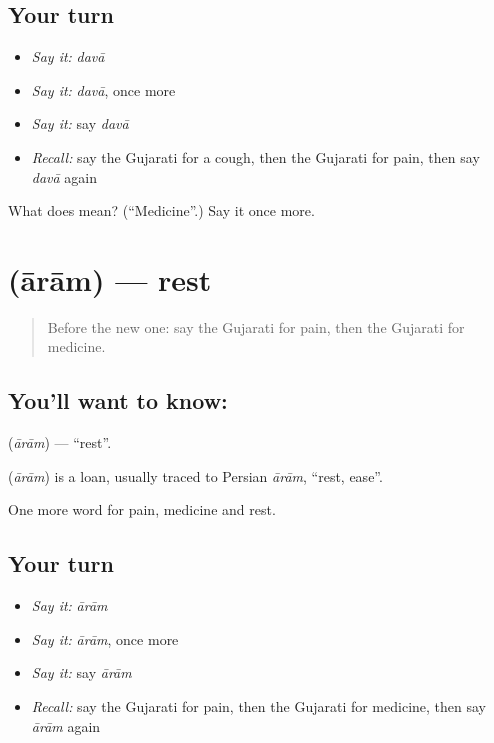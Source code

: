 \subsection*{Your turn}
\begin{itemize}
\raggedright
  \item \emph{Say it:} \emph{davā}
  \item \emph{Say it:} \emph{davā}, once more
  \item \emph{Say it:} say \emph{davā}
  \item \emph{Recall:} say the Gujarati for a cough, then the Gujarati for pain, then say \emph{davā} again
\end{itemize}

\begin{tcolorbox}[breakable,colback=teal!4,colframe=teal!35!black,title={Before you move on}]
What does  mean? (\textquotedblleft{}Medicine\textquotedblright{}.) Say it once more.
\end{tcolorbox}
\section[\texorpdfstring{\gu{આરામ} (ārām)}{આરામ (ārām)}]{ (ārām) — rest}

\label{lesson:GU-C49-rest}



\begin{quote}
Before the new one: say the Gujarati for pain, then the Gujarati for medicine.
\end{quote}

\subsection*{You'll want to know: }
\textbf{} (\emph{ārām}) — \textquotedblleft{}rest\textquotedblright{}.

\begin{cousinweb}
\textbf{} (\emph{ārām}) is a loan, usually traced to Persian \emph{ārām}, \textquotedblleft{}rest, ease\textquotedblright{}.
\end{cousinweb}

\begin{grammarlens}[title={What you've built}]
One more word for pain, medicine and rest.
\end{grammarlens}

\subsection*{Your turn}
\begin{itemize}
\raggedright
  \item \emph{Say it:} \emph{ārām}
  \item \emph{Say it:} \emph{ārām}, once more
  \item \emph{Say it:} say \emph{ārām}
  \item \emph{Recall:} say the Gujarati for pain, then the Gujarati for medicine, then say \emph{ārām} again
\end{itemize}

